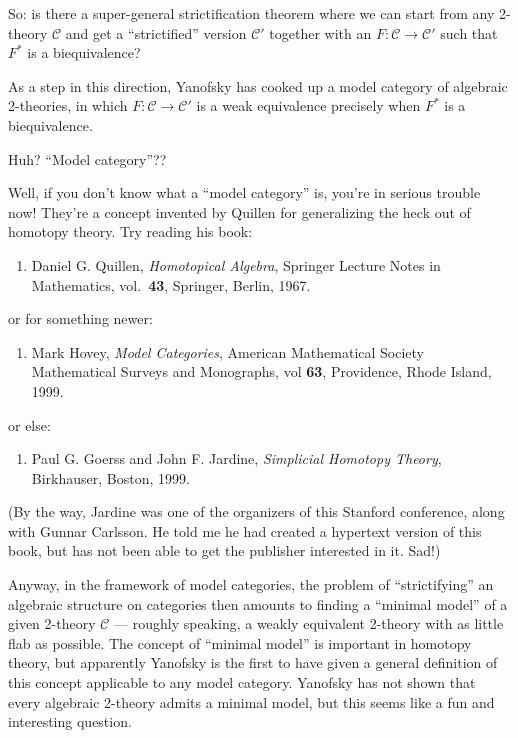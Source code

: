 \documentclass{article}
\def\tightlist{}
\begin{document}
So: is there a super-general strictification theorem where we can start
from any 2-theory \(\mathcal{C}\) and get a ``strictified'' version
\(\mathcal{C}'\) together with an \(F\colon\mathcal{C}\to\mathcal{C}'\)
such that \(F^*\) is a biequivalence?

As a step in this direction, Yanofsky has cooked up a model category of
algebraic 2-theories, in which \(F\colon\mathcal{C}\to\mathcal{C}'\) is
a weak equivalence precisely when \(F^*\) is a biequivalence.

Huh? ``Model category''??

Well, if you don't know what a ``model category'' is, you're in serious
trouble now! They're a concept invented by Quillen for generalizing the
heck out of homotopy theory. Try reading his book:

\begin{enumerate}
\def\labelenumi{\arabic{enumi})}
\setcounter{enumi}{6}
\tightlist
\item
  Daniel G. Quillen, \emph{Homotopical Algebra}, Springer Lecture Notes
  in Mathematics, vol.~\textbf{43}, Springer, Berlin, 1967.
\end{enumerate}

or for something newer:

\begin{enumerate}
\def\labelenumi{\arabic{enumi})}
\setcounter{enumi}{7}
\tightlist
\item
  Mark Hovey, \emph{Model Categories}, American Mathematical Society
  Mathematical Surveys and Monographs, vol \textbf{63}, Providence,
  Rhode Island, 1999.
\end{enumerate}

or else:

\begin{enumerate}
\def\labelenumi{\arabic{enumi})}
\setcounter{enumi}{8}
\tightlist
\item
  Paul G. Goerss and John F. Jardine, \emph{Simplicial Homotopy Theory},
  Birkhauser, Boston, 1999.
\end{enumerate}

(By the way, Jardine was one of the organizers of this Stanford
conference, along with Gunnar Carlsson. He told me he had created a
hypertext version of this book, but has not been able to get the
publisher interested in it. Sad!)

Anyway, in the framework of model categories, the problem of
``strictifying'' an algebraic structure on categories then amounts to
finding a ``minimal model'' of a given 2-theory \(\mathcal{C}\) ---
roughly speaking, a weakly equivalent 2-theory with as little flab as
possible. The concept of ``minimal model'' is important in homotopy
theory, but apparently Yanofsky is the first to have given a general
definition of this concept applicable to any model category. Yanofsky
has not shown that every algebraic 2-theory admits a minimal model, but
this seems like a fun and interesting question.
\end{document}
